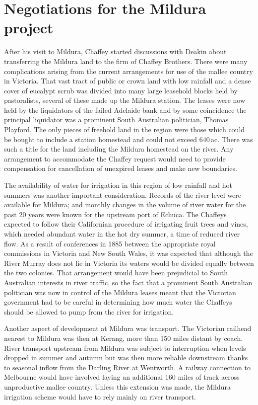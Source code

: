 \section*{Negotiations for the Mildura project}

After his visit to Mildura, Chaffey started discussions with Deakin
about transferring the Mildura land to the firm of Chaffey Brothers.
There were many complications arising from the current arrangements
for use of the mallee country in Victoria.  That vast tract of public
or crown land with low rainfall and a dense cover of eucalypt scrub
was divided into many large leasehold blocks held by pastoralists,
several of these made up the Mildura station.  The leases were now
held by the liquidators of the failed Adelaide bank and by some
coincidence the principal liquidator was a prominent South Australian
politician, Thomas Playford.  The only pieces of freehold land in the
region were those which could be bought to include a station homestead
and could not exceed 640\,ac.  There was such a title for the land
including the Mildura homestead on the river.  Any arrangement to
accommodate the Chaffey request would need to provide compensation for
cancellation of unexpired leases and make new boundaries.

The availability of water for irrigation in this region of low
rainfall and hot summers was another important consideration.  Records
of the river level were available for Mildura; and monthly changes in
the volume of river water for the past 20 years were known for the
upstream port of Echuca.  The Chaffeys expected to follow their
Californian procedure of irrigating fruit trees and vines, which
needed abundant water in the hot dry summer, a time of reduced river
flow.  As a result of conferences in 1885 between the appropriate
royal commissions in Victoria and New South Wales, it was expected
that although the River Murray does not lie in Victoria its waters
would be divided equally between the two colonies.  That arrangement
would have been prejudicial to South Australian interests in river
traffic, so the fact that a prominent South Australian politician was
now in control of the Mildura leases meant that the Victorian
government had to be careful in determining how much water the
Chaffeys should be allowed to pump from the river for irrigation.

Another aspect of development at Mildura was transport.  The Victorian
railhead nearest to Mildura was then at Kerang, more than 150 miles
distant by coach.  River transport upstream from Mildura was subject
to interruption when levels dropped in summer and autumn but was then
more reliable downstream thanks to seasonal inflow from the Darling
River at Wentworth.  A railway connection to Melbourne would have
involved laying an additional 160 miles of track across unproductive
mallee country.  Unless this extension was made, the Mildura
irrigation scheme would have to rely mainly on river transport.

